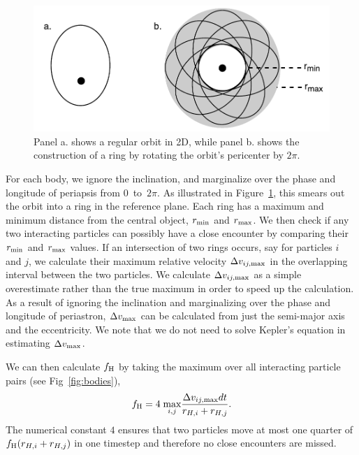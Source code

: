\begin{figure}
\centerline{\includegraphics[scale=0.6]{chap4/images/AutoHSF.pdf}}
\caption{Panel a. shows a regular orbit in 2D, while panel b. shows the construction of a ring by rotating the orbit's pericenter by $2\pi$.
 }
\label{fig:AutoHSF}
\end{figure}
For each body, we ignore the inclination, and marginalize over the phase and longitude of periapsis from $0$~to~$2\pi$.
As illustrated in Figure~\ref{fig:AutoHSF}, this smears out the orbit into a ring in the reference plane. 
Each ring has a maximum and minimum distance from the central object, $r_{\rm min}$ and $r_{\rm max}$.
We then check if any two interacting particles can possibly have a close encounter by comparing their $r_{\rm min}$ and $r_{\rm max}$ values.
If an intersection of two rings occurs, say for particles $i$ and $j$, we calculate their maximum relative velocity $\Delta v_{ij,\rm max}$ in the overlapping interval between the two particles.
We calculate $\Delta v_{ij,\rm max}$ as a simple overestimate rather than the true maximum in order to speed up the calculation.
As a result of ignoring the inclination and marginalizing over the phase and longitude of periastron, $\Delta v_{\rm max}$ can be calculated from just the semi-major axis and the eccentricity.
We note that we do not need to solve Kepler's equation in estimating $\Delta v_{\rm max}$.

We can then calculate $f_{\rm H}$ by taking the maximum over all interacting particle pairs (see Fig~\ref{fig:bodies}),
\begin{equation*}
f_{\rm H} = 4\;\underset{i,j}{\textrm{max}}\frac{ \Delta v_{ij,\rm max} dt}{r_{H, i} + r_{H,j}}.
\end{equation*}
The numerical constant $4$ ensures that two particles move at most one quarter of $f_{\rm H} (r_{H, i} + r_{H,j})$ in one timestep and therefore no close encounters are missed.

